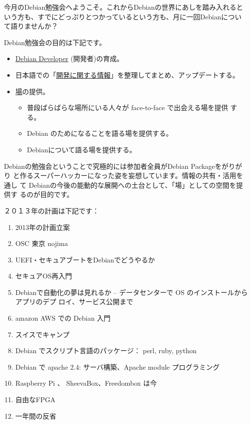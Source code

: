\documentclass[mingoth,a4paper]{jsarticle}
\begin{document}
\begin{multicols}{2}
 

 今月のDebian勉強会へようこそ。これからDebianの世界にあしを踏み入れると
 いう方も、すでにどっぷりとつかっているという方も、月に一回Debianについ
 て語りませんか？

 Debian勉強会の目的は下記です。

 \begin{itemize}
 \item \underline{Debian Developer} (開発者)の育成。
 \item 日本語での「\underline{開発に関する情報}」を整理してまとめ、アップデートする。
 \item \underline{場}の提供。
 \begin{itemize}
  \item 普段ばらばらな場所にいる人々が face-to-face で出会える場を提供
	する。
  \item Debian のためになることを語る場を提供する。
  \item Debianについて語る場を提供する。
 \end{itemize}
 \end{itemize}		

 Debianの勉強会ということで究極的には参加者全員がDebian Packageをがりがり
 と作るスーパーハッカーになった姿を妄想しています。情報の共有・活用を通し
 て Debianの今後の能動的な展開への土台として、「場」としての空間を提供す
 るのが目的です。

２０１３年の計画は下記です：
\begin{enumerate}
  \item 2013年の計画立案
 \item OSC 東京 nojima 
 \item UEFI・セキュアブートをDebianでどうやるか
 \item セキュアOS再入門
 \item Debianで自動化の夢は見れるか -- データセンターで OS のインストールからアプリのデプ
       ロイ、サービス公開まで
 \item amazon AWS での Debian 入門
 \item スイスでキャンプ
 \item Debian でスクリプト言語のパッケージ： perl, ruby, python
 \item Debian で apache 2.4: サーバ構築、Apache module プログラミング
 \item Raspberry Pi 、 SheevaBox、Freedombox は今
 \item 自由なFPGA
 \item 一年間の反省
\end{enumerate}


\end{multicols}
\end{document}
